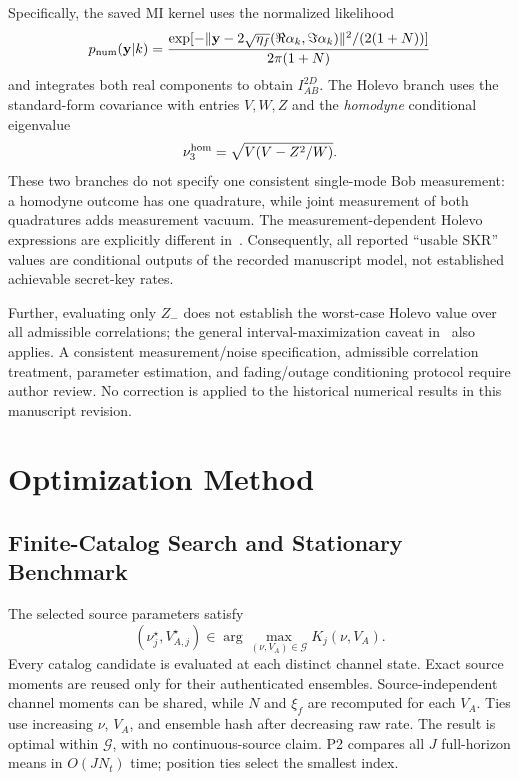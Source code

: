 Specifically, the saved MI kernel uses the normalized likelihood
\[
 p_{\rm num}(\mathbf y|k)=\frac{
 \exp[-\|\mathbf y-2\sqrt{\eta_f}(\Re\alpha_k,\Im\alpha_k)\|^2/
                 (2(1+N))]}{2\pi(1+N)}
\]
and integrates both real components to obtain $I_{AB}^{2D}$.
The Holevo branch uses the standard-form covariance with entries
$V,W,Z$ and the \emph{homodyne} conditional eigenvalue
\[
 \nu_3^{\rm hom}=\sqrt{V(V-Z^2/W)}.
\]
These two branches do not specify one consistent single-mode Bob
measurement: a homodyne outcome has one quadrature, while joint
measurement of both quadratures adds measurement vacuum. The
measurement-dependent Holevo expressions are explicitly different
in~\cite{denys2021}. Consequently, all reported ``usable SKR'' values
are conditional outputs of the recorded manuscript model, not
established achievable secret-key rates.

Further, evaluating only $Z_-$ does not establish the worst-case
Holevo value over all admissible correlations; the general
interval-maximization caveat in~\cite[Sec.~4, footnotes 11--12]{denys2021}
also applies. A consistent measurement/noise specification, admissible
correlation treatment, parameter estimation, and fading/outage
conditioning protocol require author review. No correction is applied
to the historical numerical results in this manuscript revision.

\section{Optimization Method}
\label{sec:method}
\subsection{Finite-Catalog Search and Stationary Benchmark}
The selected source parameters satisfy
\begin{equation}
 (\nu_j^\star,V_{A,j}^\star)\in
 \arg\max_{(\nu,V_A)\in\mathcal G}K_j(\nu,V_A).
 \label{eq:source_choice}
\end{equation}
Every catalog candidate is evaluated at each distinct channel state.
Exact source moments are reused only for their authenticated
ensembles. Source-independent channel moments can be shared, while
$N$ and $\xi_f$ are recomputed for each $V_A$. Ties use increasing
$\nu$, $V_A$, and ensemble hash after decreasing raw rate. The result
is optimal within $\mathcal G$, with no continuous-source claim.
P2 compares all $J$ full-horizon means in $O(JN_t)$ time; position
ties select the smallest index.

